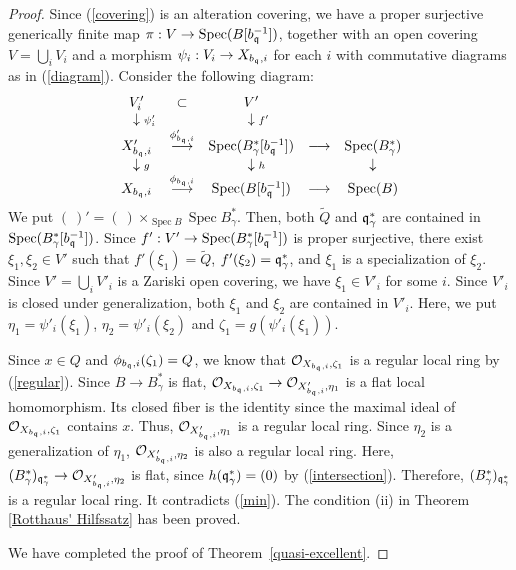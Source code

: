 \documentclass[11pt,a4paper]{amsart}
\theoremstyle{definition}
\theoremstyle{remark}
\newcommand{\Spec}{\operatorname{Spec}}
\newcommand{\fq}{\frak{q}}
\begin{document}
\begin{proof}
Since (\ref{covering}) is an alteration covering, we have a proper surjective generically finite map
$\pi:V \rightarrow \Spec(B[b_\fq^{-1}])$, together with an open covering $V = \bigcup_i V_i$ and a morphism $\psi_i:V_i \rightarrow X_{b_\fq, i}$ for each $i$ with 
commutative diagrams as in (\ref{diagram}).
Consider the following diagram:
\[
\begin{array}{ccccc}
V'_{i} & \subset & V' & & \\
\hphantom{\scriptstyle \psi'_i}\downarrow{\scriptstyle \psi'_i} & & \hphantom{\scriptstyle f'}\downarrow{\scriptstyle f'}
& & \\
X'_{b_\fq, i} & \stackrel{\phi'_{b_\fq,i}}{\longrightarrow} & \Spec(B_{\gamma}^{*}[b_\fq^{-1}])
 & \longrightarrow & \Spec(B_{\gamma}^{*}) \\
\hphantom{\scriptstyle g}\downarrow{\scriptstyle g} & & \hphantom{\scriptstyle h}\downarrow{\scriptstyle h} & & \downarrow \\
X_{b_\fq,i} & \stackrel{\phi_{b_\fq,i}}{\longrightarrow} & \Spec(B[b_\fq^{-1}])
 & \longrightarrow & \Spec(B)
\end{array}
\]
We put $( \ )'=( \ ) \times_{\Spec B} \Spec B_{\gamma}^{*}$.
Then, both $\tilde{Q}$ and $\fq_{\gamma}^{*}$ are contained in $\Spec(B_{\gamma}^{*}[b_\fq^{-1}])$.
Since $f':V' \rightarrow \Spec(B_{\gamma}^{*}[b_\fq^{-1}])$ is proper surjective, there exist $\xi_{1}, \xi_{2} \in V'$ such that $f'(\xi_{1})=\tilde{Q}$, $f'(\xi_{2})=\fq_{\gamma}^{*}$,
and $\xi_{1}$ is a specialization of $\xi_{2}$.
Since $V'=\bigcup_iV'_i$ is a Zariski open covering, we have $\xi_{1} \in V'_{i}$ for some $i$.
Since $V'_{i}$ is closed under generalization,
both $\xi_{1}$ and $\xi_{2}$ are contained in $V'_{i}$.
Here, we put $\eta_{1} = \psi'_i(\xi_{1})$, $\eta_{2} = \psi'_i(\xi_{2})$ and
$\zeta_{1} = g(\psi'_i(\xi_{1}))$.

Since $x \in Q$ and $\phi_{b_\fq, i}(\zeta_{1})=Q$,
we know that ${\mathcal O}_{X_{b_\fq, i}, \zeta_{1}}$ is a regular local ring by (\ref{regular}).
Since $B \rightarrow B_{\gamma}^{*}$ is flat, ${\mathcal O}_{X_{b_\fq, i}, \zeta_{1}} \rightarrow 
{\mathcal O}_{X'_{b_\fq, i}, \eta_{1}}$ is a flat local homomorphism.
Its closed fiber is the identity
since the maximal ideal of ${\mathcal O}_{X_{b_\fq, i}, \zeta_{1}}$ contains $x$.
Thus, ${\mathcal O}_{X'_{b_\fq, i}, \eta_{1}}$ is a regular local ring.
Since $\eta_{2}$ is a generalization of $\eta_{1}$, 
${\mathcal O}_{X'_{b_\fq, i}, \eta_{2}}$ is also a regular local ring.
Here, $(B_{\gamma}^*)_{\fq_{\gamma}^{*}} \rightarrow {\mathcal O}_{X'_{b_\fq, i}, \eta_{2}}$
is flat, since $h(\fq_{\gamma}^{*}) = (0)$ by (\ref{intersection}). Therefore, $(B_{\gamma}^*)_{\fq_{\gamma}^{*}}$ is a regular local ring. It contradicts (\ref{min}). The condition (ii) in Theorem \ref{Rotthaus' Hilfssatz} has been proved.

We have completed the proof of Theorem~\ref{quasi-excellent}.
\end{proof}
\end{document}
